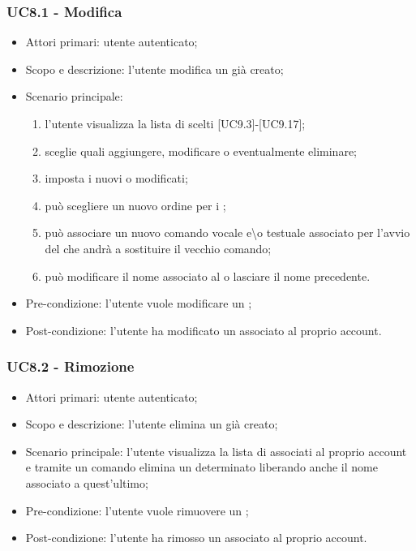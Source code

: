 \subsubsection{UC8.1 - Modifica }
\begin{itemize}
	\item  Attori primari: utente autenticato;
	\item  Scopo e descrizione: l'utente modifica un  già creato;
	\item  Scenario principale:  
	\begin{enumerate}
		\item l'utente visualizza la lista di  scelti [UC9.3]-[UC9.17];
		\item sceglie quali  aggiungere, modificare o eventualmente eliminare;
		\item imposta i  nuovi o modificati;
		\item può scegliere un nuovo ordine per i ;
		\item può associare un nuovo comando vocale e\textbackslash o testuale associato per l'avvio del  che andrà a sostituire il vecchio comando;
		\item può modificare il nome associato al  o lasciare il nome precedente.
	\end{enumerate}
	\item  Pre-condizione: l'utente vuole modificare un ;
	\item  Post-condizione: l'utente ha modificato un  associato al proprio account.
\end{itemize}
\subsubsection{UC8.2 - Rimozione }
\begin{itemize}
	\item  Attori primari: utente autenticato;
	\item  Scopo e descrizione: l'utente elimina un  già creato;
	\item  Scenario principale: l'utente visualizza la lista di  associati al proprio account e tramite un comando elimina un determinato  liberando anche il nome associato a quest'ultimo;
	\item  Pre-condizione: l'utente vuole rimuovere un ;
	\item  Post-condizione: l'utente ha rimosso un  associato al proprio account.
\end{itemize}
